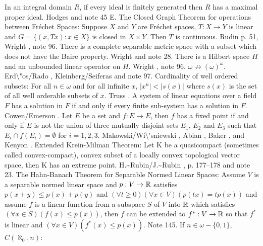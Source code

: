 \medskip
{} In an integral domain $R$, if every ideal is
finitely generated then $R$ has a maximal proper ideal. \ac{Hodges}
\cite{1974} and note 45 E.
\medskip
{} The Closed Graph Theorem for operations
between Fr\'echet Spaces: Suppose $X$ and $Y$ are Fr\'echet spaces,
$T:X\to Y$ is linear and $G=\{(x,Tx): x \in X \}$ is closed in $X\times
Y$. Then $T$ is continuous. \ac{Rudin} \cite{1991} p. 51, \ac{Wright}
\cite{1973},
note 96.  
\medskip
{}  There is a complete separable metric space
with a subset which does not have the Baire property.
\ac{Wright} \cite{1973} and note 28.
\medskip
{}  There is a Hilbert space $H$ and an  unbounded
linear operator on $H$.  \ac{Wright} \cite{1973}, note 96.
\medskip
{} $\omega\not\to(\omega)^{\omega}$. \ac{Erd\"os/Rado}
\cite{1952}, \ac{Kleinberg/Seiferas} \cite{1973} and note 97.
\medskip
{}  Cardinality of well ordered subsets:  For all
$n\in\omega$ and for all infinite $x$, $|x^n| < |s(x)|$ where $s(x)$ is
the set of all well orderable subsets of $x$.  \ac{Truss} \cite{1973d}.
\medskip
{}  A system of linear equations over a field
$F$ has a solution in $F$ if and only if every finite sub-system
has a solution in $F$. \ac{Cowen/Emerson} \cite{1996}.
\medskip
{}  Let $E$ be a set and $f: E\to E$, then $f$ has
a fixed point if and only if $E$ is not the union of three mutually
disjoint sets $E_1$, $E_2$ and $E_3$ such that $E_i \cap f(E_i) =
\emptyset$ for $i=1, 2, 3$.  \ac{Makowski/Wi\'sniewski} \cite{1969},
\ac{Abian} \cite{1968}, \ac{Baker} \cite{1964}, and \ac{Kenyon}
\cite{1963}.
\medskip
{} Extended Krein-Milman Theorem:  Let K be a
quasicompact (sometimes called convex-compact), convex subset of a
locally convex topological vector space, then K has an extreme point.
\ac{H.~Rubin/J.~Rubin} \cite{1985}, p. 177--178 and note 23.
\medskip
{} The Hahn-Banach Theorem for Separable
Normed Linear Spaces:  Assume $V$ is a separable normed linear space
and $p :V \to \Bbb R$ satisfies $p(x+y) \le p(x) + p(y)$ and
$(\forall t \ge 0)(\forall x \in V)(p(tx) = tp(x))$
and assume $f$ is a linear function from a subspace $S$ of
$V$ into $\Bbb R$ which satisfies $(\forall x \in S)(f(x) \le
p(x))$, then $f$ can be extended to $f^* :V \to \Bbb R$ so that $f^* $
is linear and $(\forall x \in V)(f^*(x) \le p(x))$.  Note 145.
\medskip
{} If $n\in\omega-\{0,1\}$, $C(\aleph_0,n)$:
